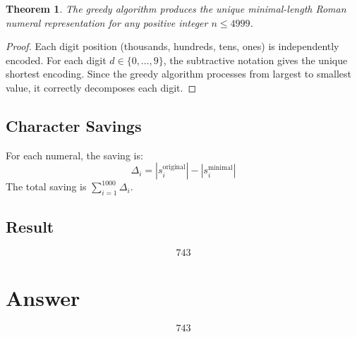 \documentclass[12pt,a4paper]{article}
\newtheorem{theorem}{Theorem}
\theoremstyle{definition}
\begin{document}
\begin{theorem}
The greedy algorithm produces the unique minimal-length Roman numeral representation for any positive integer $n \le 4999$.
\end{theorem}

\begin{proof}
Each digit position (thousands, hundreds, tens, ones) is independently encoded. For each digit $d \in \{0, \ldots, 9\}$, the subtractive notation gives the unique shortest encoding. Since the greedy algorithm processes from largest to smallest value, it correctly decomposes each digit.
\end{proof}

\subsection{Character Savings}
For each numeral, the saving is:
\[
\Delta_i = |s_i^{\text{original}}| - |s_i^{\text{minimal}}|
\]
The total saving is $\sum_{i=1}^{1000} \Delta_i$.

\subsection{Result}
\[
\boxed{743}
\]

\section{Answer}

\[
\boxed{743}
\]
\end{document}
